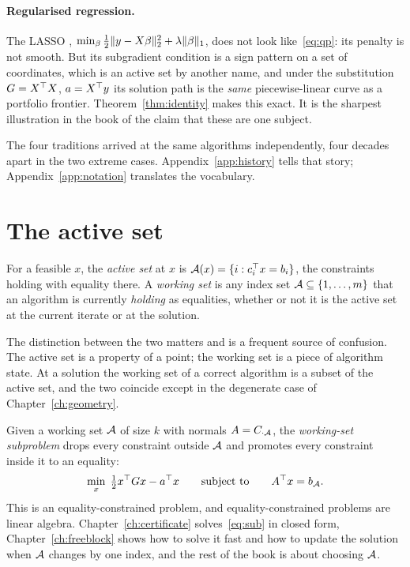 \paragraph{Regularised regression.} The LASSO
\cite{tibshirani1996}, $\min_\beta \tfrac12\lVert y - X\beta \rVert_2^2 +
\lambda\lVert \beta \rVert_1$, does not look like~\eqref{eq:qp}: its penalty is not
smooth. But its subgradient condition is a sign pattern on a set of coordinates,
which is an active set by another name, and under the substitution
$G = X^{\top} X$, $a = X^{\top} y$ its solution path is the \emph{same} piecewise-linear
curve as a portfolio frontier. Theorem~\ref{thm:identity} makes this exact. It is
the sharpest illustration in the book of the claim that these are one subject.

The four traditions arrived at the same algorithms independently, four decades
apart in the two extreme cases. Appendix~\ref{app:history} tells that story;
Appendix~\ref{app:notation} translates the vocabulary.

\section{The active set}

\begin{definition}
\label{def:activeset}
For a feasible $x$, the \emph{active set} at $x$ is
$\mathcal{A}(x) = \{i : c_i^{\top} x = b_i\}$, the constraints holding with equality
there. A \emph{working set} is any index set $\mathcal{A} \subseteq \{1,\dots,m\}$
that an algorithm is currently \emph{holding} as equalities, whether or not it
is the active set at the current iterate or at the solution.
\end{definition}

The distinction between the two matters and is a frequent source of confusion.
The active set is a property of a point; the working set is a piece of algorithm
state. At a solution the working set of a correct algorithm is a subset of the
active set, and the two coincide except in the degenerate case of
Chapter~\ref{ch:geometry}.

Given a working set $\mathcal{A}$ of size $k$ with normals $A = C_{\cdot\mathcal{A}}$, the
\emph{working-set subproblem} drops every constraint outside $\mathcal{A}$ and
promotes every constraint inside it to an equality:
\begin{equation}
  \min_{x} \; \tfrac12 x^{\top} G x - a^{\top} x
  \qquad \text{subject to} \qquad A^{\top} x = b_{\mathcal{A}} .
  \label{eq:sub}
\end{equation}
This is an equality-constrained problem, and equality-constrained problems are
linear algebra. Chapter~\ref{ch:certificate} solves~\eqref{eq:sub} in closed
form, Chapter~\ref{ch:freeblock} shows how to solve it fast and how to update the
solution when $\mathcal{A}$ changes by one index, and the rest of the book is about
choosing $\mathcal{A}$.

